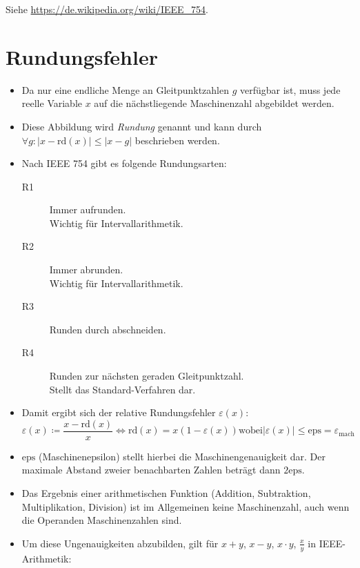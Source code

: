 \documentclass[a4paper, 11pt, accentcolor = tud3b]{tudreport}
\providecommand{\abs}[1]{\ensuremath{{\lvert #1 \rvert}}}
\providecommand{\HREF}[1]{\href{#1}{#1}}
\newcommand{\rd}{\text{rd}}
\newcommand{\eps}{\text{eps}}
\begin{document}
            Siehe \HREF{https://de.wikipedia.org/wiki/IEEE\_754}.

        \section{Rundungsfehler} %
            \begin{itemize}
            	\item Da nur eine endliche Menge an Gleitpunktzahlen \( g \) verfügbar ist, muss jede reelle Variable \( x \) auf die nächstliegende Maschinenzahl abgebildet werden.
            	\item Diese Abbildung wird \textit{Rundung} genannt und kann durch \( \forall g : \abs{x - \rd(x)} \leq \abs{x - g} \) beschrieben werden.
            	\item Nach IEEE 754 gibt es folgende Rundungsarten:
	            	\begin{description}
	            		\item[R1] Immer aufrunden. \\ Wichtig für Intervallarithmetik.
	            		\item[R2] Immer abrunden. \\ Wichtig für Intervallarithmetik.
	            		\item[R3] Runden durch abschneiden.
	            		\item[R4] Runden zur nächsten geraden Gleitpunktzahl. \\ Stellt das Standard-Verfahren dar.
	            	\end{description}
	            \item Damit ergibt sich der relative Rundungsfehler \( \varepsilon(x) \):
		            \begin{equation*}
			            \varepsilon(x) \coloneqq \frac{x - \rd(x)}{x} \iff \rd(x) = x(1 - \varepsilon(x)) \text{wobei} \abs{\varepsilon(x)} \leq \eps = \varepsilon _ \text{mach}
		            \end{equation*}
		        \item \( \eps \) (Maschinenepsilon) stellt hierbei die Maschinengenauigkeit dar. Der maximale Abstand zweier benachbarten Zahlen beträgt dann \( 2\eps \).
		        \item Das Ergebnis einer arithmetischen Funktion (Addition, Subtraktion, Multiplikation, Division) ist im Allgemeinen keine Maschinenzahl, auch wenn die Operanden Maschinenzahlen sind.
		        \item Um diese Ungenauigkeiten abzubilden, gilt für \( x + y \), \( x - y \), \( x \cdot y \), \( \frac{x}{y} \) in IEEE-Arithmetik:

\end{itemize}
\end{document}
